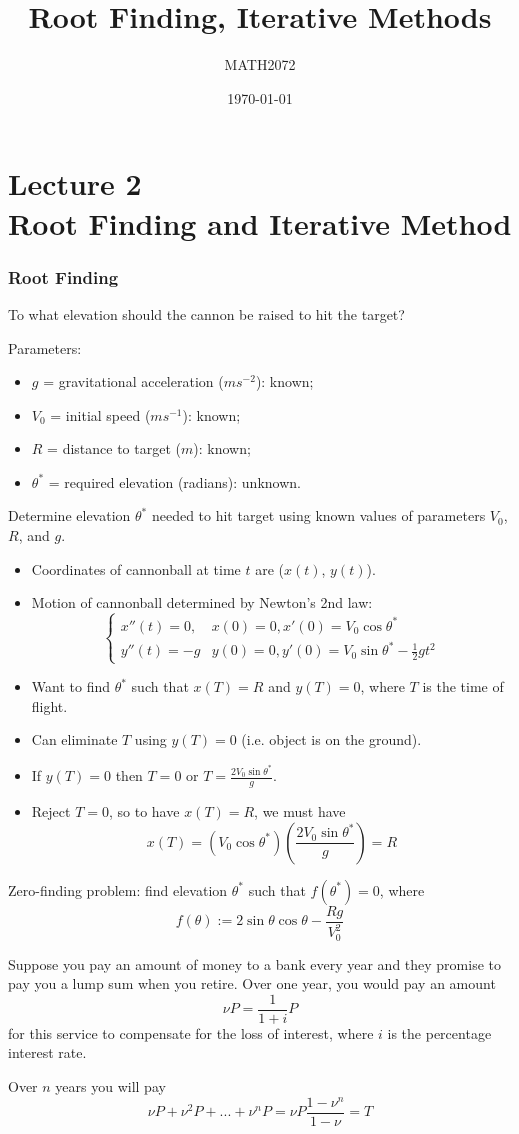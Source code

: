 \documentclass{article}
\title{Root Finding, Iterative Methods}
\author{MATH2072}
\date{\today}
\newenvironment{example}
	{\definecolor{shadethmcolor}{HTML}{FFB0B0}\definecolor{shaderulecolor}{HTML}{FF3D3D}\setlength{\shadeboxrule}{.4pt}\begin{protoexample}\normalfont}
	{\end{protoexample}}
\begin{document}
\part*{Lecture 2\\Root Finding and Iterative Method}
	
\section*{Root Finding}

\begin{example}
To what elevation should the cannon be raised to hit the target?

Parameters:
\begin{itemize}
	\item $g$ = gravitational acceleration ($ms^{-2}$): known;
	\item $V_0$ = initial speed ($ms^{-1}$): known;
	\item $R$ = distance to target ($m$): known;
	\item $\theta^*$ = required elevation (radians): unknown.
\end{itemize}

Determine elevation $\theta^*$ needed to hit target using known values of parameters $V_0$, $R$, and $g$. 

\begin{itemize}
	\item Coordinates of cannonball at time $t$ are ($x(t)$, $y(t)$).
	\item Motion of cannonball determined by Newton's 2nd law:
	\[
		\begin{cases}
		x''(t)=0, & x(0)=0,x'(0)=V_0\cos\theta^* \\
		y''(t)=-g & y(0)=0,y'(0)=V_0\sin\theta^* - \frac{1}{2}gt^2
		\end{cases}
	\]
	\item Want to find $\theta^*$ such that $x(T)=R$ and $y(T)=0$, where $T$ is the time of flight.
	\item Can eliminate $T$ using $y(T)=0$ (i.e. object is on the ground). 
	\item If $y(T) = 0$ then $T=0$ or $T=\frac{2V_0\sin\theta^*}{g}$.
	\item Reject $T=0$, so to have $x(T)=R$, we must have
	\[
		x(T) = (V_0\cos\theta^*)(\frac{2V_0\sin\theta^*}{g})=R
	\]
\end{itemize}
Zero-finding problem: find elevation $\theta^*$ such that $f(\theta^*)=0$, where
\[
	f(\theta):=2\sin\theta\cos\theta-\frac{Rg}{V_0^2}
\]
\end{example}
\clearpage
\begin{example}
Suppose you pay an amount of money to a bank every year and they promise to pay you a lump sum when you retire. Over one year, you would pay an amount
\[
	\nu P=\frac{1}{1+i}P
\]
for this service to compensate for the loss of interest, where $i$ is the percentage interest rate.

Over $n$ years you will pay
\[
	\nu P + \nu^2P + ... + \nu^nP=\nu P\frac{1-\nu^n}{1-\nu}=T
\]
\end{example}
\end{document}
